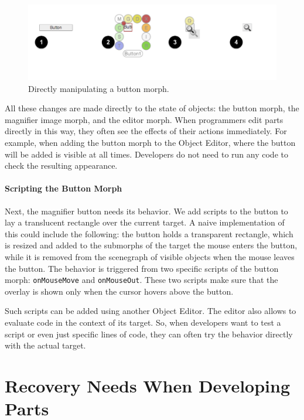 \begin{figure}[h]
    \centering
    \includegraphics[width=\textwidth]{figures/3_motivation/3_buildingTheButton.png}
    \caption{Directly manipulating a button morph.}
    \label{fig:ButtonBuilding}
\end{figure}

All these changes are made directly to the state of objects: the button morph, the magnifier image morph, and the editor morph.
When programmers edit parts directly in this way, they often see the effects of their actions immediately.
For example, when adding the button morph to the Object Editor, where the button will be added is visible at all times.
Developers do not need to run any code to check the resulting appearance.

\paragraph{Scripting the Button Morph}
Next, the magnifier button needs its behavior.
We add scripts to the button to lay a translucent rectangle over the current target.
A naive implementation of this could include the following: the button holds a transparent rectangle, which is resized and added to the submorphs of the target the mouse enters the button, while it is removed from the scenegraph of visible objects when the mouse leaves the button.
The behavior is triggered from two specific scripts of the button morph: \lstinline{onMouseMove} and \lstinline{onMouseOut}.
These two scripts make sure that the overlay is shown only when the cursor hovers above the button.

Such scripts can be added using another Object Editor.
The editor also allows to evaluate code in the context of its target.
So, when developers want to test a script or even just specific lines of code, they can often try the behavior directly with the actual target.


\section{Recovery Needs When Developing Parts}

